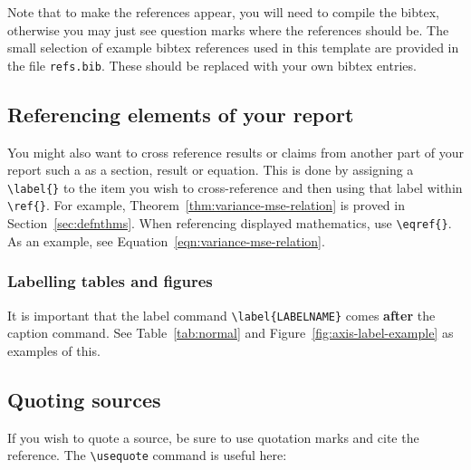 Note that to make the references appear, you will need to compile the bibtex, otherwise you may just see question marks where the references should be. The small selection of example bibtex references used in this template are provided in the file \texttt{refs.bib}. These should be replaced with your own bibtex entries.
 
\subsection{Referencing elements of your report}

You might also want to cross reference results or claims from another part of your report such a as a section, result or equation. This is done by assigning a \texttt{\textbackslash label\{\}} to the item you wish to cross-reference and then using that label within \texttt{\textbackslash ref\{\}}. For example, Theorem~\ref{thm:variance-mse-relation} is proved in Section~\ref{sec:defnthms}. When referencing displayed mathematics, use \texttt{\textbackslash eqref\{\}}. As an example, see 
Equation~\eqref{eqn:variance-mse-relation}.

\subsubsection{Labelling tables and figures}

It is important that the label command
\texttt{\textbackslash label\{LABELNAME\}} comes \textbf{after} the caption command.
See Table~\ref{tab:normal} and Figure~\ref{fig:axis-label-example} as examples of this.

\subsection{Quoting sources}
If you wish to quote a source, be sure to use quotation marks and cite the
reference. The \texttt{\textbackslash{usequote}} command is useful here:

 \citep{dickens1859}

